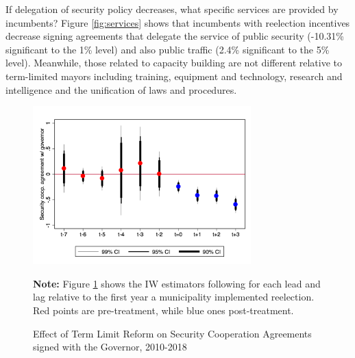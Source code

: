 \documentclass[12pt]{amsart}
\numberwithin{equation}{section}
\theoremstyle{definition}
\theoremstyle{definition}
\theoremstyle{definition}
\begin{document}
     
If delegation of security policy decreases, what specific services are provided by incumbents? Figure \ref{fig:services} shows that incumbents with reelection incentives decrease signing agreements that delegate the service of public security (-10.31\% significant to the 1\% level) and also public traffic (2.4\% significant to the 5\% level). Meanwhile, those related to capacity building are not different relative to term-limited mayors including training, equipment and technology, research and intelligence and the unification of laws and procedures. 

\begin{figure}[h] 
\centering
 \caption{Effect of Term Limit Reform on Security Cooperation Agreements signed with the Governor, 2010-2018}
 \label{fig:event_study_agreements}
\includegraphics[width=0.75\textwidth]{Figures/catts_agreements.png}
       \captionsetup{justification=centering}
       
 \textbf{Note:} Figure \ref{fig:event_study_agreements} shows the IW estimators following \citet{abraham_sun_2020} for each lead and lag relative to the first year a municipality implemented reelection. Red points are pre-treatment, while blue ones post-treatment. 
     
\end{figure}   
\end{document}
